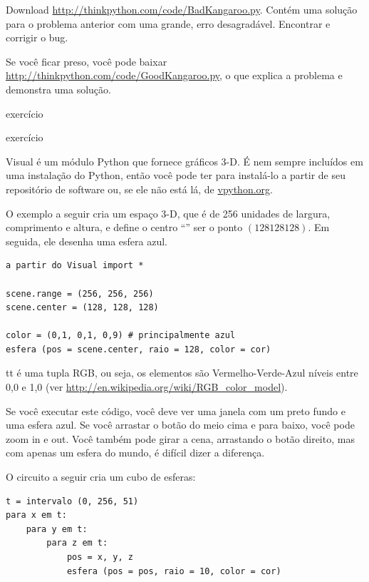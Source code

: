 \documentclass[10pt]{book}
\begin{document}
\begin{v erbatim}
\begin{}
Download \url{http://thinkpython.com/code/BadKangaroo.py}. Contém
uma solução para o problema anterior com uma grande, erro desagradável.
Encontrar e corrigir o bug.

Se você ficar preso, você pode baixar
\url{http://thinkpython.com/code/GoodKangaroo.py}, o que explica a
problema e demonstra uma solução.

\end{} exercício




\begin{} exercício

Visual é um módulo Python que fornece gráficos 3-D. É
nem sempre incluídos em uma instalação do Python, então você pode ter
para instalá-lo a partir de seu repositório de software ou, se ele não está lá,
de \url{vpython.org}.

O exemplo a seguir cria um espaço 3-D, que é de 256 unidades
de largura, comprimento e altura, e define o centro ``'' ser o
ponto $ (128128128) $. Em seguida, ele desenha uma esfera azul.

\begin{verbatim}
a partir do Visual import *

scene.range = (256, 256, 256)
scene.center = (128, 128, 128)

color = (0,1, 0,1, 0,9) # principalmente azul
esfera (pos = scene.center, raio = 128, color = cor)
\end{verbatim}

{\Color tt} é uma tupla RGB, ou seja, os elementos são Vermelho-Verde-Azul
níveis entre 0,0 e 1,0 (ver
\url{http://en.wikipedia.org/wiki/RGB_color_model}).

Se você executar este código, você deve ver uma janela com um preto
fundo e uma esfera azul. Se você arrastar o botão do meio
cima e para baixo, você pode zoom in e out. Você também pode girar
a cena, arrastando o botão direito, mas com apenas um
esfera do mundo, é difícil dizer a diferença.

O circuito a seguir cria um cubo de esferas:

\begin{verbatim}
t = intervalo (0, 256, 51)
para x em t:
    para y em t:
        para z em t:
            pos = x, y, z
            esfera (pos = pos, raio = 10, color = cor)
\end{verbatim}


\end{}
\end{v erbatim}
\end{document}
